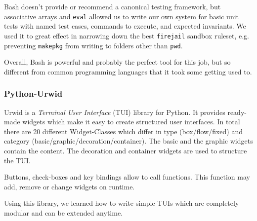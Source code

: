 Bash doesn't provide or recommend a canonical testing framework, but associative arrays and \texttt{eval} allowed us to write our own system for basic unit tests with named test cases, commands to execute, and expected invariants.
We used it to great effect in narrowing down the best \texttt{firejail} sandbox ruleset, e.g. preventing \texttt{makepkg} from writing to folders other than \texttt{pwd}.

Overall, Bash is powerful and probably the perfect tool for this job, but so different from common programming languages that it took some getting used to.

\subsubsection*{Python-Urwid}
Urwid \cite{urwid} is a \emph{Terminal User Interface} (TUI) library for Python. It provides ready-made widgets which make it easy to create structured user interfaces. In total there are 20 different Widget-Classes which differ in type (box/flow/fixed) and category (basic/graphic/decoration/container). The basic and the graphic widgets contain the content. The decoration and container widgets are used to structure the TUI.

Buttons, check-boxes and key bindings allow to call functions. This function may add, remove or change widgets on runtime.

Using this library, we learned how to write simple TUIs which are completely modular and can be extended anytime.
